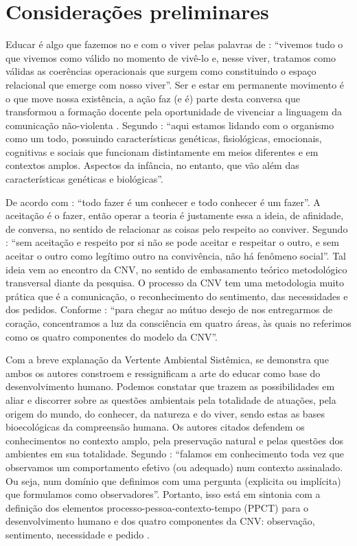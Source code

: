 \documentclass{textolivre}
\begin{document}
\section{Considerações preliminares}\label{sec-consideracoes}
Educar é algo que fazemos no e com o viver pelas palavras de \textcite[p. 185]{maturana2009}: “vivemos tudo o que vivemos como válido no momento de vivê-lo e, nesse viver, tratamos como válidas as coerências operacionais que surgem como constituindo o espaço relacional que emerge com nosso viver”. Ser e estar em permanente movimento é o que move nossa existência, a ação faz (e é) parte desta conversa que transformou a formação docente pela oportunidade de vivenciar a linguagem da comunicação não-violenta \cite{rosenberg2006}. Segundo \textcite[p. 96]{brofen2011}: ``aqui estamos lidando com o organismo como um todo, possuindo características genéticas, fisiológicas, emocionais, cognitivas e sociais que funcionam distintamente em meios diferentes e em contextos amplos. Aspectos da infância, no entanto, que vão além das características genéticas e biológicas''.

De acordo com \textcite[p. 32]{maturana2011}: “todo fazer é um conhecer e todo conhecer é um fazer”. A aceitação é o fazer, então operar a teoria é justamente essa a ideia, de afinidade, de conversa, no sentido de relacionar as coisas pelo respeito ao conviver. Segundo \textcite[p. 31]{maturana1998}: “sem aceitação e respeito por si não se pode aceitar e respeitar o outro, e sem aceitar o outro como legítimo outro na convivência, não há fenômeno social”. Tal ideia vem ao encontro da CNV, no sentido de embasamento teórico metodológico transversal diante da pesquisa. O processo da CNV tem uma metodologia muito prática que é a comunicação, o reconhecimento do sentimento, das necessidades e dos pedidos. Conforme \textcite[p. 25]{rosenberg2006}: “para chegar ao mútuo desejo de nos entregarmos de coração, concentramos a luz da consciência em quatro áreas, às quais no referimos como os quatro componentes do modelo da CNV”.

Com a breve explanação da Vertente Ambiental Sistêmica, se demonstra que ambos os autores constroem e ressignificam a arte do educar como base do desenvolvimento humano. Podemos constatar que \textcite{maturana2011,brofen2011,rosenberg2006} trazem as possibilidades em aliar e discorrer sobre as questões ambientais pela totalidade de atuações, pela origem do mundo, do conhecer, da natureza e do viver, sendo estas as bases bioecológicas da compreensão humana. Os autores citados defendem os conhecimentos no contexto amplo, pela preservação natural e pelas questões dos ambientes em sua totalidade. Segundo \textcite[p. 195]{maturana2011}: “falamos em conhecimento toda vez que observamos um comportamento efetivo (ou adequado) num contexto assinalado. Ou seja, num domínio que definimos com uma pergunta (explicita ou implícita) que formulamos como observadores”. Portanto, isso está em sintonia com a definição dos elementos processo-pessoa-contexto-tempo (PPCT) para o desenvolvimento humano \cite{brofen2011} e dos quatro componentes da CNV: observação, sentimento, necessidade e pedido \cite{rosenberg2006}. 
\end{document}
